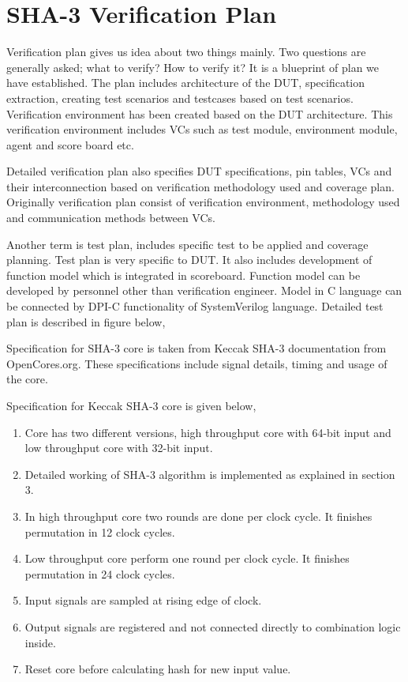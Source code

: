 \chapter{SHA-3 Verification Plan}

Verification plan gives us idea about two things mainly. Two questions are generally asked; what to verify? How to verify it?  It is a blueprint of plan we have established. The plan includes architecture of the DUT, specification extraction, creating test scenarios and testcases based on test scenarios. Verification environment has been created based on the DUT architecture. This verification environment includes VCs such as test module, environment module, agent and score board etc. \par

Detailed verification plan also specifies DUT specifications, pin tables, VCs and their interconnection based on verification methodology used and coverage plan. Originally verification plan consist of verification environment, methodology used and communication methods between VCs. \par

Another term is test plan, includes specific test to be applied and coverage planning. Test plan is very specific to DUT. It also includes development of function model which is integrated in scoreboard. Function model can be developed by personnel other than verification engineer. Model in C language can be connected by DPI-C functionality of SystemVerilog language. Detailed test plan is described in figure below,




Specification for SHA-3 core is taken from Keccak SHA-3 documentation from OpenCores.org. These specifications include signal details, timing and usage of the core. \par


Specification for Keccak SHA-3 core is given below,

\begin{enumerate}
\item Core has two different versions, high throughput core with 64-bit input and low throughput core with 32-bit input.
\item Detailed working of SHA-3 algorithm is implemented as explained in section 3.
\item In high throughput core two rounds are done per clock cycle. It finishes permutation in 12 clock cycles.
\item Low throughput core perform one round per clock cycle. It finishes permutation in 24 clock cycles.
\item Input signals are sampled at rising edge of clock.
\item Output signals are registered and not connected directly to combination logic inside.
\item Reset core before calculating hash for new input value.

\end{enumerate}

